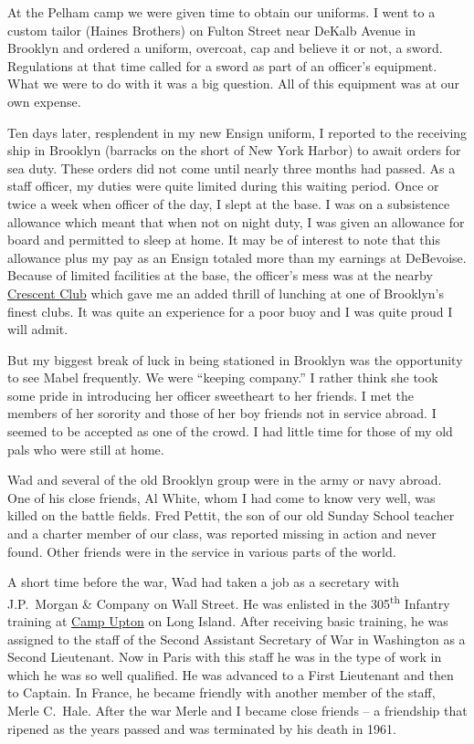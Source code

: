 \documentclass[12pt]{book}              %
\begin{document}
At the Pelham camp we were given time to obtain our uniforms. I went to a custom tailor (Haines Brothers) on Fulton Street near DeKalb Avenue in Brooklyn and ordered a uniform, overcoat, cap and believe it or not, a sword. Regulations at that time called for a sword as part of an officer's equipment. What we were to do with it was a big question. All of this equipment was at our own expense. 

Ten days later, resplendent in my new Ensign uniform, I reported to the receiving ship in Brooklyn (barracks on the short of New York Harbor) to await orders for sea duty. These orders did not come until nearly three months had passed. As a staff officer, my duties were quite limited during this waiting period. Once or twice a week when officer of the day, I slept at the base. I was on a subsistence allowance which meant that when not on night duty, I was given an allowance for board and permitted to sleep at home. It may be of interest to note that this allowance plus my pay as an Ensign totaled more than my earnings at DeBevoise. Because of limited facilities at the base, the officer's mess was at the nearby \href{http://en.wikipedia.org/wiki/Crescent_Athletic_Club_House}{Crescent Club} which gave me an added thrill of lunching at one of Brooklyn's finest clubs. It was quite an experience for a poor buoy and I was quite proud I will admit. 

But my biggest break of luck in being stationed in Brooklyn was the opportunity to see Mabel frequently. We were ``keeping company.'' I rather think she took some pride in introducing her officer sweetheart to her friends. I met the members of her sorority and those of her boy friends not in service abroad. I seemed to be accepted as one of the crowd. I had little time for those of my old pals who were still at home. 

Wad and several of the old Brooklyn group were in the army or navy abroad. One of his close friends, Al White, whom I had come to know very well, was killed on the battle fields. Fred Pettit, the son of our old Sunday School teacher and a charter member of our class, was reported missing in action and never found. Other friends were in the service in various parts of the world. 

A short time before the war, Wad had taken a job as a secretary with J.P.~Morgan \& Company on Wall Street. He was enlisted in the 305\textsuperscript{th} Infantry training at \href{http://en.wikipedia.org/wiki/Camp_Upton}{Camp Upton} on Long Island. After receiving basic training, he was assigned to the staff of the Second Assistant Secretary of War in Washington as a Second Lieutenant. Now in Paris with this staff he was in the type of work in which he was so well qualified. He was advanced to a First Lieutenant and then to Captain. In France, he became friendly with another member of the staff, Merle C.~Hale. After the war Merle and I became close friends -- a friendship that ripened as the years passed and was terminated by his death in 1961. 
\end{document}
